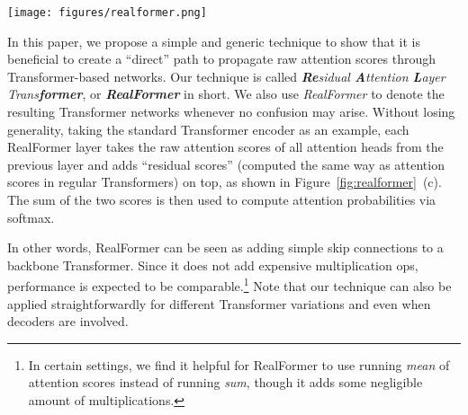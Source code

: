\documentclass[11pt,a4paper]{article}
\begin{document}
\begin{figure*}[!h]
\centering
\texttt{[image: figures/realformer.png]}
\caption{Comparison of different styles of Transformer layers: (a) The prevalent Post-LN layer used by (\emph{e.g.}) BERT; (b) Pre-LN layer used by (\emph{e.g.}) GPT-2 that creates a ``direct'' path to propagate token embeddings; (c) Our RealFormer layer that creates a ``direct'' path to propagate attention scores (by adding a simple skip edge on top of (a)). Note that here we are showing Transformer encoder for demonstration purposes only; RealFormer can be applied straightforwardly for different Transformer variations (\emph{e.g.}, when decoders are involved).}
\label{fig:realformer}
\end{figure*}


In this paper, we propose a simple and generic technique to show that it is beneficial to create a ``direct'' path to propagate raw attention scores through Transformer-based networks. Our technique is called \textit{\textbf{Re}sidual \textbf{A}ttention \textbf{L}ayer Trans\textbf{former}}, or \textit{\textbf{RealFormer}} in short. 
We also use \emph{RealFormer} to denote the resulting Transformer networks whenever no confusion may arise.
Without losing generality, taking the standard Transformer encoder as an example, each RealFormer layer takes the raw attention scores of all attention heads from the previous layer and adds ``residual scores'' (computed the same way as attention scores in regular Transformers) on top, as shown in Figure~\ref{fig:realformer}~(c). The sum of the two scores is then used to compute attention probabilities via softmax.

In other words, RealFormer can be seen as adding simple skip connections to a backbone Transformer. Since it does not add expensive multiplication ops, performance is expected to be comparable.\footnote{In certain settings, we find it helpful for RealFormer to use running \emph{mean} of attention scores instead of running \emph{sum}, though it adds some negligible amount of multiplications.}
Note that our technique can also be applied straightforwardly for different Transformer variations and even when decoders are involved.
\end{document}
